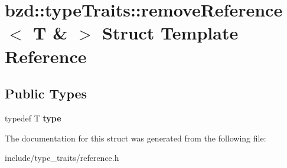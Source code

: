 \hypertarget{structbzd_1_1typeTraits_1_1removeReference_3_01T_01_6_01_4}{}\section{bzd\+:\+:type\+Traits\+:\+:remove\+Reference$<$ T \& $>$ Struct Template Reference}
\label{structbzd_1_1typeTraits_1_1removeReference_3_01T_01_6_01_4}
\subsection*{Public Types}
\begin{DoxyCompactItemize}
\item 
\mbox{\label{structbzd_1_1typeTraits_1_1removeReference_3_01T_01_6_01_4_a86ec563b72a2b3b095a2529dfa0a65f1}} 
typedef T {\bfseries type}
\end{DoxyCompactItemize}


The documentation for this struct was generated from the following file\+:\begin{DoxyCompactItemize}
\item 
include/type\+\_\+traits/reference.\+h\end{DoxyCompactItemize}
